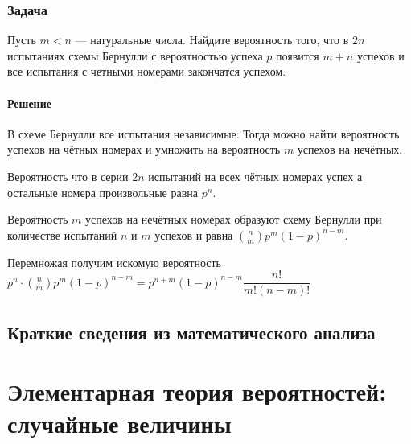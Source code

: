 \documentclass[a4paper,12pt]{article}
\begin{document}
\subsubsection*{Задача}
Пусть \(m<n\) — натуральные числа. Найдите вероятность того, что в \(2n\) испытаниях схемы Бернулли с вероятностью успеха \(p\) появится \(m+n\) успехов и все испытания с четными номерами закончатся успехом.
\paragraph{Решение}
В схеме Бернулли все испытания независимые. Тогда можно найти вероятность успехов на чётных номерах и умножить на вероятность \(m\) успехов на нечётных. 

Вероятность что в серии \(2n\) испытаний на всех чётных номерах успех а остальные номера произвольные равна \(p^n\). 

Вероятность \(m\) успехов на нечётных номерах  образуют схему Бернулли при  количестве испытаний \(n\) и \(m\) успехов и равна \(\binom{n}{m}p^m(1-p)^{n-m}\).

Перемножая получим искомую вероятность \( p^n \cdot \binom{n}{m}p^m(1-p)^{n-m} = p^{n+m}(1-p)^{n-m}\dfrac{n!}{m!(n-m)!} \)

\subsection{Краткие сведения из математического анализа}


\section{Элементарная теория вероятностей: случайные величины}
\end{document}
